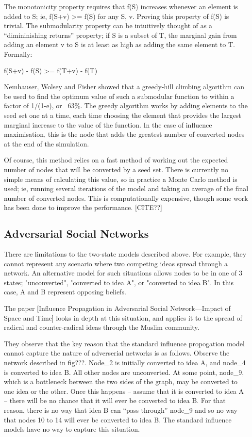 The monotonicity property requires that f(S) increases whenever an element is added to S; ie, f(S+v) >= f(S) for any S, v. Proving this property of f(S) is trivial. The submodularity property can be intuitively thought of as a ``dimininishing returns'' property; if S is a subset of T, the marginal gain from adding an element v to S is at least as high as adding the same element to T. Formally:

f(S+v) - f(S) >= f(T+v) - f(T)

Nemhauser, Wolsey and Fisher showed that a greedy-hill climbing algorithm can be used to find the optimum value of such a submodular function to within a factor of 1/(1-e), or ~63\%. The greedy algorithm works by adding elements to the seed set one at a time, each time choosing the element that provides the largest marginal increase to the value of the function. In the case of influence maximisation, this is the node that adds the greatest number of converted nodes at the end of the simulation.

Of course, this method relies on a fast method of working out the expected number of nodes that will be converted by a seed set. There is currently no simple means of calculating this value, so in practice a Monte Carlo method is used; ie, running several iterations of the model and taking an average of the final number of converted nodes. This is computationally expensive, though some work has been done to improve the performance. [CITE??]

\subsection{Adversarial Social Networks}

 There are limitations to the two-state models described above. For example, they cannot represent any scenario where two competing ideas spread through a network. An alternative model for such situations allows nodes to be in one of 3 states; "unconverted", "converted to idea A", or "converted to idea B". In this case, A and B represent opposing beliefs.

The paper [Influence Propagation in Adversarial Social Network—Impact of Space and Time] looks in depth at this situation, and applies it to the spread of radical and counter-radical ideas through the Muslim community.

They observe that the key reason that the standard influence propogation model cannot capture the nature of adverserial networks is as follows. Observe the network described in fig???. Node\_2 is initially converted to idea A, and node\_4 is converted to idea B. All other nodes are unconverted. At some point, node\_9, which is a bottleneck between the two sides of the graph, may be converted to one idea or the other. Once this happens -- assume that it is converted to idea A -- there will be no chance that it will ever be converted to idea B. For that reason, there is no way that idea B can ``pass through'' node\_9 and so no way that nodes 10 to 14 will ever be converted to idea B. The standard influence models have no way to capture this situation.


